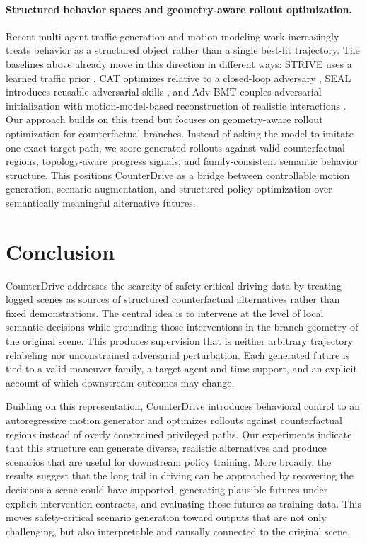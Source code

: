 \documentclass{article}
\begin{document}
\paragraph{Structured behavior spaces and geometry-aware rollout optimization.}
Recent multi-agent traffic generation and motion-modeling work increasingly treats behavior as a structured object rather than a single best-fit trajectory. The baselines above already move in this direction in different ways: STRIVE uses a learned traffic prior \citep{rempe2022strive}, CAT optimizes relative to a closed-loop adversary \citep{zhang2023cat}, SEAL introduces reusable adversarial skills \citep{stoler2025seal}, and Adv-BMT couples adversarial initialization with motion-model-based reconstruction of realistic interactions \citep{liu2025advbmt}. Our approach builds on this trend but focuses on geometry-aware rollout optimization for counterfactual branches. Instead of asking the model to imitate one exact target path, we score generated rollouts against valid counterfactual regions, topology-aware progress signals, and family-consistent semantic behavior structure. This positions CounterDrive as a bridge between controllable motion generation, scenario augmentation, and structured policy optimization over semantically meaningful alternative futures.


\section{Conclusion}
\label{sec:conclusion}
CounterDrive addresses the scarcity of safety-critical driving data by treating logged scenes as sources of structured counterfactual alternatives rather than fixed demonstrations. The central idea is to intervene at the level of local semantic decisions while grounding those interventions in the branch geometry of the original scene. This produces supervision that is neither arbitrary trajectory relabeling nor unconstrained adversarial perturbation. Each generated future is tied to a valid maneuver family, a target agent and time support, and an explicit account of which downstream outcomes may change.

Building on this representation, CounterDrive introduces behavioral control to an autoregressive motion generator and optimizes rollouts against counterfactual regions instead of overly constrained privileged paths. Our experiments indicate that this structure can generate diverse, realistic alternatives and produce scenarios that are useful for downstream policy training. More broadly, the results suggest that the long tail in driving can be approached by recovering the decisions a scene could have supported, generating plausible futures under explicit intervention contracts, and evaluating those futures as training data. This moves safety-critical scenario generation toward outputs that are not only challenging, but also interpretable and causally connected to the original scene.
\end{document}
